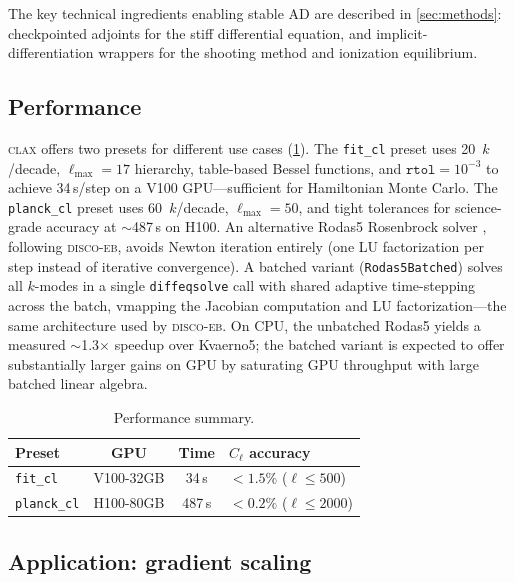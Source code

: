 \documentclass{article}
\newcommand{\clax}{\textsc{clax}\xspace}
\newcommand{\discoeb}{\textsc{disco-eb}\xspace}
\newcommand{\Cl}{C_\ell}
\begin{document}
The key technical ingredients enabling stable AD are described in \cref{sec:methods}: checkpointed adjoints for the stiff differential equation, and implicit-differentiation wrappers for the shooting method and ionization equilibrium.

\subsection{Performance}

\clax offers two presets for different use cases (\cref{tab:performance}).
The \texttt{fit\_cl} preset uses 20~$k$/decade, $\ell_\mathrm{max} = 17$ hierarchy, table-based Bessel functions, and $\texttt{rtol} = 10^{-3}$ to achieve 34\,s/step on a V100 GPU---sufficient for Hamiltonian Monte Carlo.
The \texttt{planck\_cl} preset uses 60~$k$/decade, $\ell_\mathrm{max} = 50$, and tight tolerances for science-grade accuracy at $\sim$487\,s on H100.
An alternative Rodas5 Rosenbrock solver \citep{dimarzio1993}, following \discoeb, avoids Newton iteration entirely (one LU factorization per step instead of iterative convergence).
A batched variant (\texttt{Rodas5Batched}) solves all $k$-modes in a single \texttt{diffeqsolve} call with shared adaptive time-stepping across the batch, vmapping the Jacobian computation and LU factorization---the same architecture used by \discoeb.
On CPU, the unbatched Rodas5 yields a measured $\sim$1.3$\times$ speedup over Kvaerno5; the batched variant is expected to offer substantially larger gains on GPU by saturating GPU throughput with large batched linear algebra.

\begin{table}[t]
\caption{Performance summary.}
\label{tab:performance}
\centering
\small
\begin{tabular}{lccl}
\toprule
Preset & GPU & Time & $\Cl$ accuracy \\
\midrule
\texttt{fit\_cl} & V100-32GB & 34\,s & $<1.5\%$ ($\ell \leq 500$) \\
\texttt{planck\_cl} & H100-80GB & 487\,s & $<0.2\%$ ($\ell \leq 2000$) \\
\bottomrule
\end{tabular}
\end{table}

\subsection{Application: gradient scaling}
\end{document}

